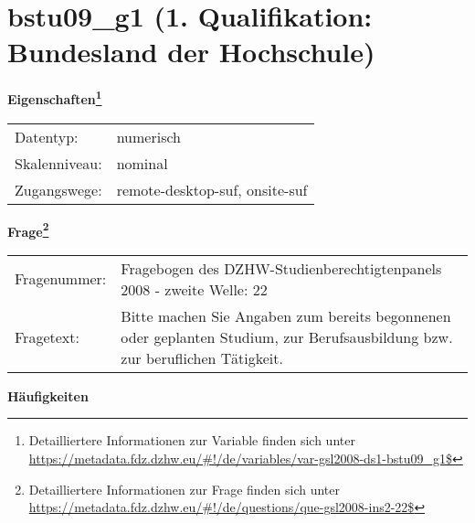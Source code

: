 
    \setcounter{footnote}{0}

    \vspace*{-1.8cm}
	\section{bstu09\_g1 (1. Qualifikation: Bundesland der Hochschule)}
	\label{section:bstu09_g1}



    \vspace*{0.5cm}
    \noindent\textbf{Eigenschaften\footnote{Detailliertere Informationen zur Variable finden sich unter
		\url{https://metadata.fdz.dzhw.eu/\#!/de/variables/var-gsl2008-ds1-bstu09_g1$}}}\\
	\begin{tabularx}{\hsize}{@{}lX}
	Datentyp: & numerisch \\
	Skalenniveau: & nominal \\
	Zugangswege: &
	  remote-desktop-suf, 
	  onsite-suf
 \\
    \end{tabularx}



				\vspace*{0.5cm}
                \noindent\textbf{Frage\footnote{Detailliertere Informationen zur Frage finden sich unter
		              \url{https://metadata.fdz.dzhw.eu/\#!/de/questions/que-gsl2008-ins2-22$}}}\\
				\begin{tabularx}{\hsize}{@{}lX}
					Fragenummer: &
					  Fragebogen des DZHW-Studienberechtigtenpanels 2008 - zweite Welle:
					  22
 \\
					Fragetext: & Bitte machen Sie Angaben zum bereits begonnenen oder geplanten Studium, zur Berufsausbildung bzw. zur beruflichen Tätigkeit. \\
				\end{tabularx}





        		\vspace*{0.5cm}
                \noindent\textbf{Häufigkeiten}


